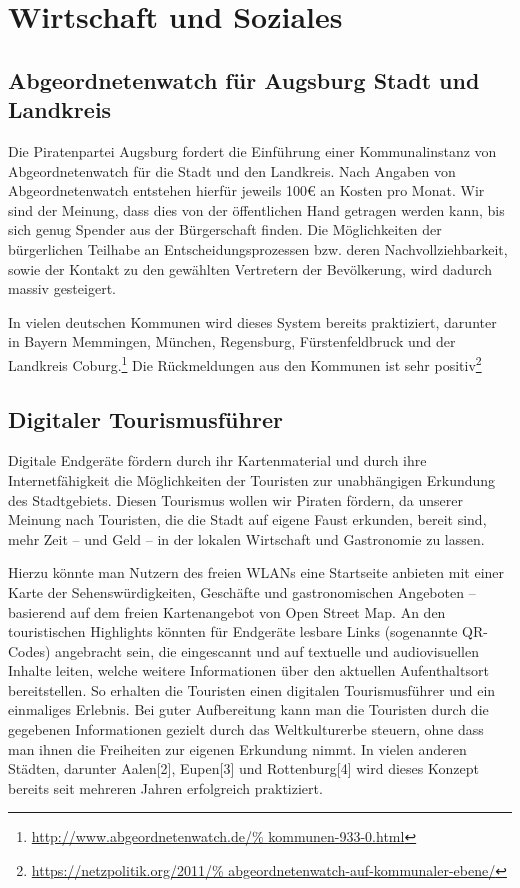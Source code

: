 \chapter{Wirtschaft und Soziales}

  \section{Abgeordnetenwatch für Augsburg Stadt und Landkreis}
  
  Die Piratenpartei Augsburg fordert die Einführung einer Kommunalinstanz von 
  Abgeordnetenwatch für die Stadt und den Landkreis. Nach Angaben von 
  Abgeordnetenwatch entstehen hierfür jeweils 100€ an Kosten pro Monat. Wir 
  sind der Meinung, dass dies von der öffentlichen Hand getragen werden kann, 
  bis sich genug Spender aus der Bürgerschaft finden. Die Möglichkeiten der 
  bürgerlichen Teilhabe an Entscheidungsprozessen bzw. deren 
  Nachvollziehbarkeit, sowie der Kontakt zu den gewählten Vertretern der 
  Bevölkerung, wird dadurch massiv gesteigert. 
  
  In vielen deutschen Kommunen wird dieses System bereits praktiziert, 
  darunter in Bayern Memmingen, München, Regensburg, Fürstenfeldbruck und der 
  Landkreis Coburg.\footnote{\url{http://www.abgeordnetenwatch.de/%
  kommunen-933-0.html}} Die Rückmeldungen aus den Kommunen ist sehr 
  positiv\footnote{\url{https://netzpolitik.org/2011/%
  abgeordnetenwatch-auf-kommunaler-ebene/}}
  
  \section{Digitaler Tourismusführer}
  
  Digitale Endgeräte fördern durch ihr Kartenmaterial und durch ihre 
  Internetfähigkeit die Möglichkeiten der Touristen zur unabhängigen Erkundung 
  des Stadtgebiets. Diesen Tourismus wollen wir Piraten fördern, da unserer 
  Meinung nach Touristen, die die Stadt auf eigene Faust erkunden, bereit 
  sind, mehr Zeit – und Geld – in der lokalen Wirtschaft und Gastronomie zu 
  lassen.
  
  Hierzu könnte man Nutzern des freien WLANs eine Startseite anbieten mit 
  einer Karte der Sehenswürdigkeiten, Geschäfte und gastronomischen Angeboten 
  – basierend auf dem freien Kartenangebot von Open Street Map. An den 
  touristischen Highlights könnten für Endgeräte lesbare Links (sogenannte 
  QR-Codes) angebracht sein, die eingescannt und auf textuelle und audiovisuellen 
  Inhalte leiten, welche weitere Informationen über den aktuellen 
  Aufenthaltsort bereitstellen. So erhalten die Touristen einen digitalen 
  Tourismusführer und ein einmaliges Erlebnis. Bei guter Aufbereitung kann man 
  die Touristen durch die gegebenen Informationen gezielt durch das 
  Weltkulturerbe steuern, ohne dass man ihnen die Freiheiten zur eigenen 
  Erkundung nimmt. In vielen anderen Städten, darunter Aalen[2], Eupen[3] und 
  Rottenburg[4] wird dieses Konzept bereits seit mehreren Jahren erfolgreich 
  praktiziert.
  
